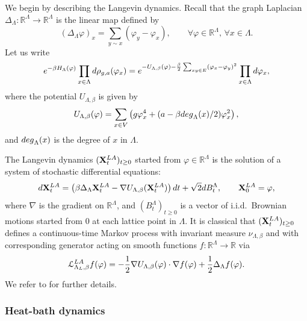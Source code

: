 \documentclass[11pt,a4paper]{article}
\theoremstyle{definition}
\numberwithin{equation}{section}
\begin{document}
We begin by describing the Langevin dynamics. Recall that the graph Laplacian $\Delta_\Lambda: \mathbb R^\Lambda \rightarrow \mathbb R^\Lambda$ is the linear map defined by
\begin{equation}
(\Delta_\Lambda \varphi)_x = \sum_{y \sim x} (\varphi_y-\varphi_x), \qquad \forall \varphi \in \mathbb R^\Lambda, \, \forall x \in \Lambda.
\end{equation} 
Let us write
\begin{equation}
e^{-\beta H_{\Lambda}(\varphi)} \prod_{x \in \Lambda} {\rm d}\rho_{g,a}(\varphi_x) = e^{-U_{\Lambda,\beta}(\varphi)-\frac \beta 2\sum_{xy \in E}(\varphi_x-\varphi_y)^2} \prod_{x \in \Lambda}{\rm d}\varphi_x,
\end{equation}
where the potential $U_{\Lambda,\beta}$ is given by
\begin{equation}
U_{\Lambda,\beta}(\varphi) = \sum_{x \in V} \left( g\varphi_x^4 + (a-\beta {\rm deg}_\Lambda(x)/2)\varphi_x^2 \right),
\end{equation}
and ${\rm deg}_\Lambda(x)$ is the degree of $x$ in $\Lambda$.

The Langevin dynamics $(\mathbf X_t^{\rm LA})_{t \geq 0}$ started from $\varphi \in \mathbb R^\Lambda$ is the solution of a system of stochastic differential equations:
\begin{equation}
{\rm d} \mathbf X_t^{\rm LA} = \left(\beta \Delta_\Lambda \mathbf X^{\rm LA}_t -\nabla U_{\Lambda,\beta} ( \mathbf X^{\rm LA}_t) \right) {\rm d}t + \sqrt 2  {\rm d}B_t^{\Lambda}, \qquad \mathbf X^{\rm LA}_0 = \varphi,
\end{equation}
where $\nabla$ is the gradient on $\mathbb R^\Lambda$, and $(B_t^\Lambda)_{t \geq 0}$ is a vector of i.i.d.\ Brownian motions started from $0$ at each lattice point in $\Lambda$. It is classical that $(\mathbf X_t^{\rm LA})_{t \geq 0}$ defines a continuous-time Markov process with invariant measure $\nu_{\Lambda,\beta}$ and with corresponding generator acting on smooth functions $f:\mathbb R^\Lambda \rightarrow \mathbb R$ via
\begin{equation}
\mathcal L_{\Lambda_L,\beta}^{\rm LA} f(\varphi) = -\frac 12\nabla U_{\Lambda,\beta}(\varphi) \cdot \nabla f(\varphi) + \frac 12 \Delta_\Lambda f(\varphi).
\end{equation}
We refer to \cite{RT96} for further details.



\subsubsection{Heat-bath dynamics}
\end{document}
